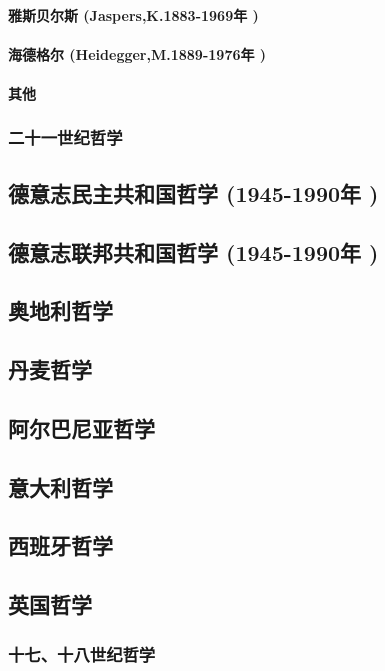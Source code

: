 \documentclass[UTF8]{../RepresentationUniverse}
\begin{document}
    \paragraph{雅斯贝尔斯 (Jaspers,K.1883-1969年 )}
    \paragraph{海德格尔 (Heidegger,M.1889-1976年 )}
    \paragraph{其他}
\subsubsection{二十一世纪哲学}



\subsection{德意志民主共和国哲学 (1945-1990年 )}
\subsection{德意志联邦共和国哲学 (1945-1990年 )}
\subsection{奥地利哲学}
\subsection{丹麦哲学}
\subsection{阿尔巴尼亚哲学}
\subsection{意大利哲学}
\subsection{西班牙哲学}


\subsection{英国哲学}
\subsubsection{十七、十八世纪哲学}
\end{document}
